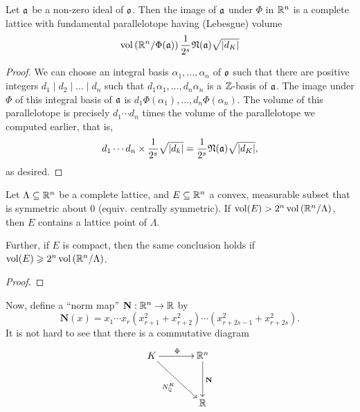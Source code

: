 \begin{theorem}
    Let $\mathfrak{a}$ be a non-zero ideal of $\mathfrak{o}$. Then the image of $\mathfrak{a}$ under $\Phi$ in $\mathbb{R}^n$ is a complete lattice with fundamental parallelotope having (Lebesgue) volume 
    \begin{equation*}
        \operatorname{vol}\left(\mathbb{R}^n/\Phi(\mathfrak{a})\right)\frac{1}{2^s}\mathfrak{N}(\mathfrak{a})\sqrt{|d_K|}
    \end{equation*}
\end{theorem}
\begin{proof}
    We can choose an integral basis $\alpha_1,\dots,\alpha_n$ of $\mathfrak{o}$ such that there are positive integers $d_1\mid d_2\mid\dots\mid d_n$ such that $d_1\alpha_1,\dots, d_n\alpha_n$ is a $\mathbb{Z}$-basis of $\mathfrak{a}$. The image under $\Phi$ of this integral basis of $\mathfrak{a}$ is $d_1\Phi(\alpha_1),\dots, d_n\Phi(\alpha_n)$. The volume of this parallelotope is precisely $d_1\cdots d_n$ times the volume of the parallelotope we computed earlier, that is, 
    \begin{equation*}
        d_1\cdots d_n\times\frac{1}{2^s}\sqrt{|d_k|} = \frac{1}{2^s}\mathfrak{N}(\mathfrak{a})\sqrt{|d_K|},
    \end{equation*}
    as desired.
\end{proof}

\begin{lemma}[Minkowski]
    Let $\Lambda\subseteq\mathbb{R}^n$ be a complete lattice, and $E\subseteq\mathbb{R}^n$ a convex, measurable subset that is symmetric about $0$ (equiv. centrally symmetric). If $\operatorname{vol}(E) > 2^n\operatorname{vol}\left(\mathbb{R}^n/\Lambda\right)$, then $E$ contains a lattice point of $\Lambda$. 
    
    \noindent Further, if $E$ is compact, then the same conclusion holds if $\operatorname{vol}(E)\geqslant 2^n\operatorname{vol}\left(\mathbb{R}^n/\Lambda\right)$.
\end{lemma}
\begin{proof}
\end{proof}

Now, define a ``norm map'' $\mathbf{N}: \mathbb{R}^n\to\mathbb{R}$ by 
\begin{equation*}
    \mathbf{N}(x) = x_1\cdots x_r\left(x_{r + 1}^2 + x_{r + 2}^2\right)\cdots\left(x_{r + 2s - 1}^{2} + x_{r + 2s}^2\right).
\end{equation*}
It is not hard to see that there is a commutative diagram 
\begin{equation*}
    \xymatrix@+1pc {
        K\ar[r]^\Phi\ar[rd]_{N^K_{\Q}} & \R^n\ar[d]^{\mathbf{N}}\\
        & \R
    }
\end{equation*}

